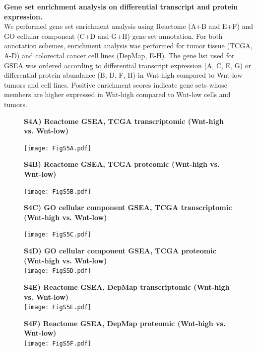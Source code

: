 \documentclass[11pt,a4paper,titlepage]{article}
\begin{document}
\textbf{Gene set enrichment analysis on differential transcript and protein expression.}\\
We performed gene set enrichment analysis using Reactome (A+B and E+F) and GO cellular component (C+D and G+H) gene set annotation. For both annotation schemes, enrichment analysis was performed for tumor tissue (TCGA, A-D) and colorectal cancer cell lines (DepMap, E-H). The gene list used for GSEA was ordered according to differential transcript expression (A, C, E, G) or differential protein abundance (B, D, F, H) in Wnt-high compared to Wnt-low tumors and cell lines. Positive enrichment scores indicate gene sets whose members are higher expressed in Wnt-high compared to Wnt-low cells and tumors.

\begin{figure}[h!]
\textbf{S4A) Reactome GSEA, TCGA transcriptomic (Wnt-high vs. Wnt-low)}

\smallskip
\texttt{[image: FigS5A.pdf]} 
\end{figure}

\begin{figure}[h!]
\textbf{S4B) Reactome GSEA, TCGA proteomic (Wnt-high vs. Wnt-low)}

\smallskip
\texttt{[image: FigS5B.pdf]} 
\end{figure}

\begin{figure}[h!]
\textbf{S4C) GO cellular component GSEA, TCGA transcriptomic (Wnt-high vs. Wnt-low)}

\smallskip
\texttt{[image: FigS5C.pdf]} 
\end{figure}

\begin{figure}[h!]
\textbf{S4D) GO cellular component GSEA, TCGA proteomic (Wnt-high vs. Wnt-low)}\\

\smallskip
\texttt{[image: FigS5D.pdf]} 
\end{figure}

\begin{figure}[h!]
\textbf{S4E) Reactome GSEA, DepMap transcriptomic (Wnt-high vs. Wnt-low)}\\

\smallskip
\texttt{[image: FigS5E.pdf]} 
\end{figure}

\begin{figure}[h!]
\textbf{S4F) Reactome GSEA, DepMap proteomic (Wnt-high vs. Wnt-low)}\\

\smallskip
\texttt{[image: FigS5F.pdf]} 
\end{figure}
\end{document}
